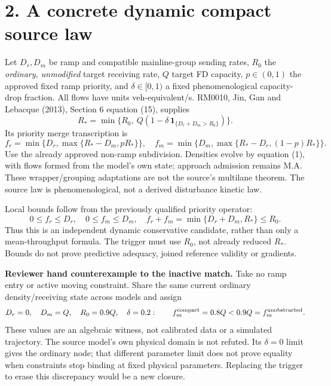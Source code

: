 \documentclass[11pt,a4paper]{article}
\begin{document}
\newpage
\section*{2. A concrete dynamic compact source law}
Let $D_r,D_m$ be ramp and compatible mainline-group sending rates, $R_0$ the
\emph{ordinary, unmodified} target receiving rate, $Q$ target FD capacity,
$p\in(0,1)$ the approved fixed ramp priority, and $\delta\in[0,1)$ a fixed
phenomenological capacity-drop fraction. All flows have units veh-equivalent/s.
RM0010, Jin, Gan and Lebacque (2013), Section 6 equation (15), supplies
\begin{equation}
R_* = \min\{R_0,\ Q(1-\delta\,
 \mathbf 1_{\{D_r+D_m>R_0\}})\}.
\end{equation}
Its priority merge transcription is
\begin{equation}
f_r=\min\{D_r,\max\{R_*-D_m,pR_*\}\},\quad
f_m=\min\{D_m,\max\{R_*-D_r,(1-p)R_*\}\}.
\end{equation}
Use the already approved non-ramp subdivision. Densities evolve by equation
(1), with flows formed from the model's own state; approach admission remains
M.A. These wrapper/grouping adaptations are not the source's multilane theorem.
The source law is phenomenological, not a derived disturbance kinetic law.

Local bounds follow from the previously qualified priority operator:
\begin{equation}
0\le f_r\le D_r,\quad 0\le f_m\le D_m,\quad
f_r+f_m=\min\{D_r+D_m,R_*\}\le R_0.
\end{equation}
Thus this is an independent dynamic conservative candidate, rather than only a
mean-throughput formula. The trigger must use $R_0$, not already reduced $R_*$.
Bounds do not prove predictive adequacy, joined reference validity or gradients.

\textbf{Reviewer hand counterexample to the inactive match.}
Take no ramp entry or active moving constraint. Share the same current ordinary
density/receiving state across models and assign
\begin{equation}
D_r=0,\quad D_m=Q,\quad R_0=0.9Q,\quad\delta=0.2:
\qquad f_m^{\rm compact}=0.8Q<0.9Q=f_m^{\rm unobstructed}.
\end{equation}
These values are an algebraic witness, not calibrated data or a simulated
trajectory. The source model's own physical domain is not refuted. Its
$\delta=0$ limit gives the ordinary node; that different parameter limit does
not prove equality when constraints stop binding at fixed physical parameters.
Replacing the trigger to erase this discrepancy would be a new closure.
\end{document}
